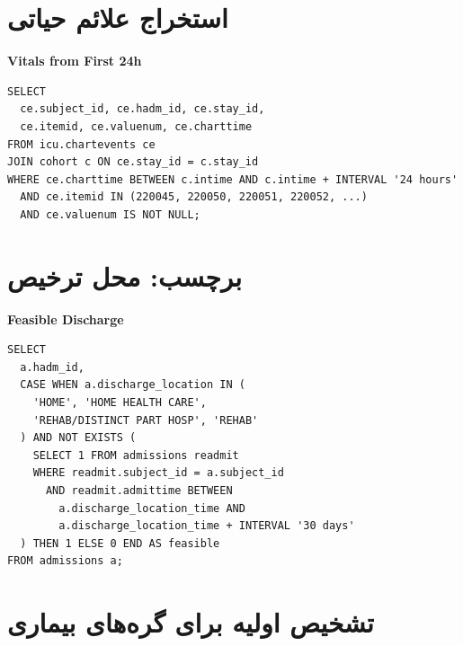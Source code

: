 \section{استخراج علائم حیاتی}

\begin{latin}\smallskip\noindent\textbf{Vitals from First 24h}\par\smallskip
\begin{Verbatim}[fontsize=\footnotesize,frame=single]
SELECT 
  ce.subject_id, ce.hadm_id, ce.stay_id,
  ce.itemid, ce.valuenum, ce.charttime
FROM icu.chartevents ce
JOIN cohort c ON ce.stay_id = c.stay_id
WHERE ce.charttime BETWEEN c.intime AND c.intime + INTERVAL '24 hours'
  AND ce.itemid IN (220045, 220050, 220051, 220052, ...)
  AND ce.valuenum IS NOT NULL;
\end{Verbatim}
\end{latin}

\section{برچسب: محل ترخیص}

\begin{latin}\smallskip\noindent\textbf{Feasible Discharge}\par\smallskip
\begin{Verbatim}[fontsize=\footnotesize,frame=single]
SELECT 
  a.hadm_id,
  CASE WHEN a.discharge_location IN (
    'HOME', 'HOME HEALTH CARE', 
    'REHAB/DISTINCT PART HOSP', 'REHAB'
  ) AND NOT EXISTS (
    SELECT 1 FROM admissions readmit 
    WHERE readmit.subject_id = a.subject_id 
      AND readmit.admittime BETWEEN 
        a.discharge_location_time AND 
        a.discharge_location_time + INTERVAL '30 days'
  ) THEN 1 ELSE 0 END AS feasible
FROM admissions a;
\end{Verbatim}
\end{latin}

\section{تشخیص اولیه برای گره‌های بیماری}

